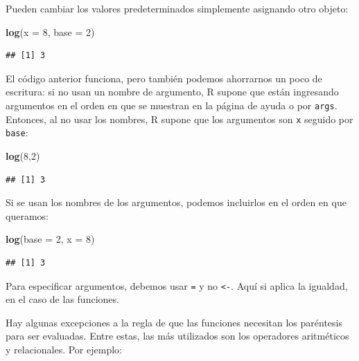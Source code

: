 \documentclass[
]{book}
\newenvironment{Shaded}{\begin{snugshade}}{\end{snugshade}}
\newcommand{\AttributeTok}[1]{\textcolor[rgb]{0.13,0.29,0.53}{#1}}
\newcommand{\DecValTok}[1]{\textcolor[rgb]{0.00,0.00,0.81}{#1}}
\newcommand{\FunctionTok}[1]{\textcolor[rgb]{0.13,0.29,0.53}{\textbf{#1}}}
\newcommand{\NormalTok}[1]{#1}
\begin{document}
Pueden cambiar los valores predeterminados simplemente asignando otro objeto:

\begin{Shaded}
\begin{Highlighting}[]
\FunctionTok{log}\NormalTok{(}\AttributeTok{x =} \DecValTok{8}\NormalTok{, }\AttributeTok{base =} \DecValTok{2}\NormalTok{)}
\end{Highlighting}
\end{Shaded}

\begin{verbatim}
## [1] 3
\end{verbatim}

El código anterior funciona, pero también podemos ahorrarnos un poco de escritura: si no usan un nombre de argumento, R supone que están ingresando argumentos en el orden en que se muestran en la página de ayuda o por \texttt{args}.
Entonces, al no usar los nombres, R supone que los argumentos son \texttt{x} seguido por \texttt{base}:

\begin{Shaded}
\begin{Highlighting}[]
\FunctionTok{log}\NormalTok{(}\DecValTok{8}\NormalTok{,}\DecValTok{2}\NormalTok{)}
\end{Highlighting}
\end{Shaded}

\begin{verbatim}
## [1] 3
\end{verbatim}

Si se usan los nombres de los argumentos, podemos incluirlos en el orden en que queramos:

\begin{Shaded}
\begin{Highlighting}[]
\FunctionTok{log}\NormalTok{(}\AttributeTok{base =} \DecValTok{2}\NormalTok{, }\AttributeTok{x =} \DecValTok{8}\NormalTok{)}
\end{Highlighting}
\end{Shaded}

\begin{verbatim}
## [1] 3
\end{verbatim}

Para especificar argumentos, debemos usar \texttt{=} y no \texttt{\textless{}-}.
Aquí si aplica la igualdad, en el caso de las funciones.

Hay algunas excepciones a la regla de que las funciones necesitan los paréntesis para ser evaluadas.
Entre estas, las más utilizados son los operadores aritméticos y relacionales.
Por ejemplo:
\end{document}
